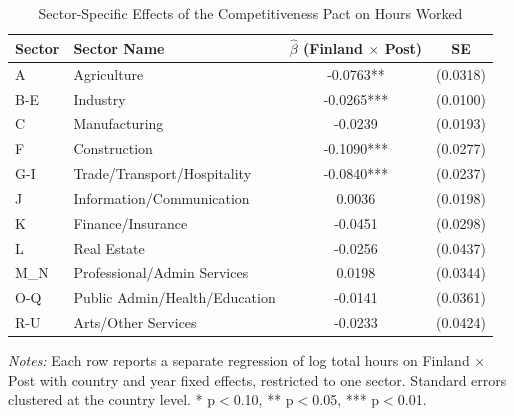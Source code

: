 \begin{table}[H]
\centering
\caption{Sector-Specific Effects of the Competitiveness Pact on Hours Worked}
\label{tab:sector}
\begin{threeparttable}
\begin{tabular}{llcc}
\toprule
Sector & Sector Name & $\hat{\beta}$ (Finland $\times$ Post) & SE \\
\midrule
A & Agriculture & -0.0763** & (0.0318) \\
B-E & Industry & -0.0265*** & (0.0100) \\
C & Manufacturing & -0.0239 & (0.0193) \\
F & Construction & -0.1090*** & (0.0277) \\
G-I & Trade/Transport/Hospitality & -0.0840*** & (0.0237) \\
J & Information/Communication & 0.0036 & (0.0198) \\
K & Finance/Insurance & -0.0451 & (0.0298) \\
L & Real Estate & -0.0256 & (0.0437) \\
M_N & Professional/Admin Services & 0.0198 & (0.0344) \\
O-Q & Public Admin/Health/Education & -0.0141 & (0.0361) \\
R-U & Arts/Other Services & -0.0233 & (0.0424) \\
\bottomrule
\end{tabular}
\begin{tablenotes}[flushleft]
\small
\item \textit{Notes:} Each row reports a separate regression of log total hours on Finland $\times$ Post with country and year fixed effects, restricted to one sector. Standard errors clustered at the country level. * p$<$0.10, ** p$<$0.05, *** p$<$0.01.
\end{tablenotes}
\end{threeparttable}
\end{table}

